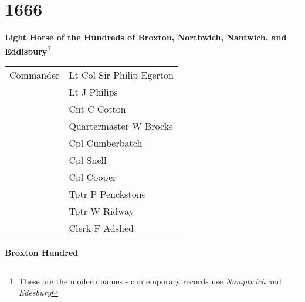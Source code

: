 \chapter*{1666}

\begin{center}
  \Large
  \textbf{Light Horse of the Hundreds of Broxton, Northwich, Nantwich, and Eddisbury\footnote{These are the modern names - contemporary records use \textit{Namptwich} and \textit{Edesbury}}}
\end{center}

\begin{center}
  \begin{tabular}{rl}
    Commander & Lt Col Sir Philip Egerton \\
    & Lt J Philips \\
    & Cnt C Cotton \\
    & Quartermaster W Brocke \\
    & Cpl Cumberbatch \\
    & Cpl Snell \\
    & Cpl Cooper \\
    & Tptr P Penckstone \\
    & Tptr W Ridway \\
    & Clerk F Adshed \\
  \end{tabular}
\end{center}

\begin{center}
  \Large
  \textbf{Broxton Hundred}
\end{center}

